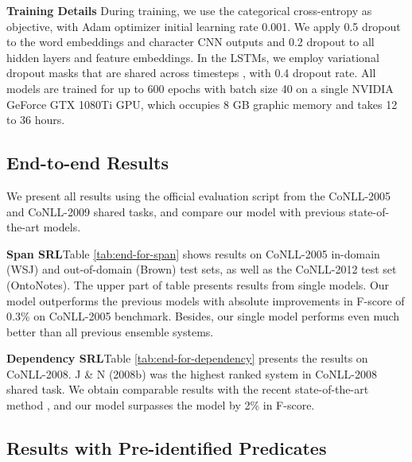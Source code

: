 \documentclass[letterpaper]{article} \usepackage{aaai19}  \usepackage{times}  \usepackage{helvet}  \usepackage{courier}  \usepackage{url}  \usepackage{graphicx}  \frenchspacing  \setlength{\pdfpagewidth}{8.5in}  \setlength{\pdfpageheight}{11in}
\begin{document}
\noindent \textbf{Training Details} \quad
During training, we use the categorical cross-entropy as objective, with Adam optimizer \cite{adam2015} initial learning rate 0.001. We apply 0.5 dropout to the word embeddings and character CNN outputs and 0.2 dropout to all hidden layers and feature embeddings. In the LSTMs, we employ variational dropout masks that are shared across timesteps \cite{gal2016}, with 0.4 dropout rate. All models are trained for up to 600 epochs with batch size 40 on a single NVIDIA GeForce GTX 1080Ti GPU, which occupies 8 GB graphic memory and takes 12 to 36 hours.



\subsection{End-to-end Results}
We present all results using the official evaluation script from the CoNLL-2005 and CoNLL-2009 shared tasks, and compare our model with previous state-of-the-art models.
 
\noindent \textbf{Span SRL}\quad Table \ref{tab:end-for-span} shows results on CoNLL-2005 in-domain (WSJ) and out-of-domain (Brown) test sets, as well as the CoNLL-2012 test set (OntoNotes). The upper part of table presents results from single models. Our model outperforms the previous models with absolute improvements in F-score of 0.3\% on CoNLL-2005 benchmark. Besides, our single model performs even much better than all previous ensemble systems.


\noindent \textbf{Dependency SRL}\quad Table \ref{tab:end-for-dependency} presents the results on CoNLL-2008. J \& N (2008b) \cite{Johansson2008Dependency} was the highest ranked system in CoNLL-2008 shared task. We obtain comparable results with the recent state-of-the-art method \cite{cai2018full}, and our model surpasses the model \cite{he:2018Syntax} by 2\% in F-score. 



\subsection{Results with Pre-identified Predicates}
\end{document}
